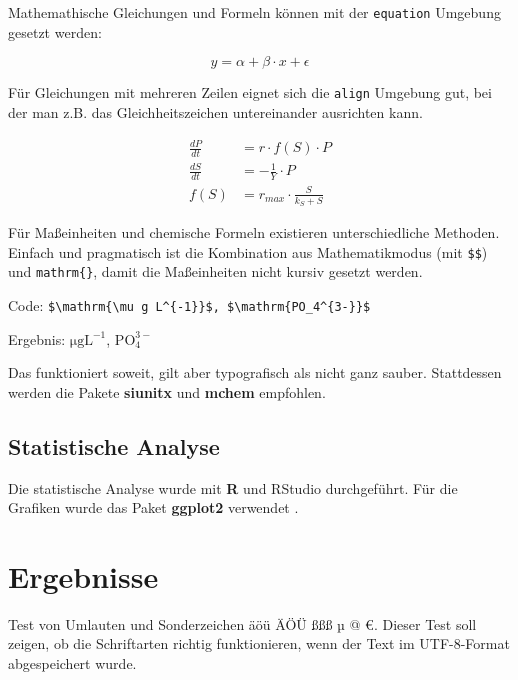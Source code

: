 \documentclass[english,ngerman,BCOR=6mm,cdgeometry=no,parskip=half,DIV=13]{tudscrreprt}
\begin{document}
Mathemathische Gleichungen und Formeln können mit der \texttt{equation} Umgebung gesetzt werden:

\begin{equation}
	y = \alpha + \beta \cdot x + \epsilon
\end{equation}

Für Gleichungen mit mehreren Zeilen eignet sich die \texttt{align} Umgebung gut, bei der man z.B. das Gleichheitszeichen untereinander ausrichten kann.

\begin{align}
\frac{dP}{dt} &= r \cdot f(S) \cdot P \\
\frac{dS}{dt} &= - \frac{1}{Y} \cdot P \\
f(S) &= r_{max} \cdot \frac{S}{k_S + S}
\end{align}

Für Maßeinheiten und chemische Formeln existieren unterschiedliche Methoden. Einfach und pragmatisch ist die Kombination aus Mathematikmodus (mit \verb#$$#) und \verb#mathrm{}#, damit die Maßeinheiten nicht kursiv gesetzt werden.


Code: \verb#$\mathrm{\mu g L^{-1}}$, $\mathrm{PO_4^{3-}}$#

Ergebnis: $\mathrm{\mu g L^{-1}}$, $\mathrm{PO_4^{3-}}$

Das funktioniert soweit, gilt aber typografisch als nicht ganz sauber. Stattdessen werden die Pakete
\textbf{siunitx} und \textbf{mchem} empfohlen.


\section{Statistische Analyse}

Die statistische Analyse wurde mit \textbf{R} \parencite{r-core-2024} und RStudio
\parencite{rstudio-2024} durchgeführt. Für die Grafiken
wurde das Paket \textbf{ggplot2} verwendet \parencite{wickham-ggplot2-2016}.


\chapter{Ergebnisse}

Test von Umlauten und Sonderzeichen äöü ÄÖÜ ßßß µ @ €. Dieser Test soll zeigen,
ob die Schriftarten richtig funktionieren, wenn der Text im UTF-8-Format
abgespeichert wurde.
\end{document}
